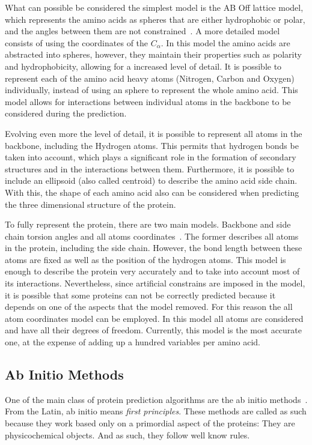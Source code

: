What can possible be considered the simplest model is the AB Off lattice model,
which represents the amino acids as spheres that are either hydrophobic or
polar, and the angles between them are not
constrained~\cite{berger1998protein}.  A more detailed model consists of using
the coordinates of the $C_\alpha$. In this model the amino acids are abstracted
into spheres, however, they maintain their properties such as polarity and
hydrophobicity, allowing for a increased level of detail. It is possible to
represent each of the amino acid heavy atoms (Nitrogen, Carbon and Oxygen)
individually, instead of using an sphere to represent the whole amino acid.
This model allows for interactions between individual atoms in the  backbone to
be considered during the prediction.

Evolving even more the level of detail, it is possible to represent all atoms
in the backbone, including the Hydrogen atoms. This permits that hydrogen bonds
be taken into account, which plays a significant role in the formation of
secondary structures and in the interactions between them. Furthermore, it is
possible to include an ellipsoid (also called centroid) to describe the amino
acid side chain. With this, the shape of each amino acid also can be considered
when predicting the three dimensional structure of the protein.

To fully represent the protein, there are two main models. Backbone and side
chain torsion angles and all atoms coordinates~\cite{rohl2004protein}.  The
former describes all atoms in the protein, including the side chain. However,
the bond length between these atoms are fixed as well as the position of the
hydrogen atoms. This model is enough to describe the protein very accurately
and to take into account most of its interactions. Nevertheless, since
artificial constrains are imposed in the model, it is possible that some
proteins can not be correctly predicted because it depends on one of the
aspects that the model removed. For this reason the all atom coordinates model
can be employed. In this model all atoms are considered and have all their
degrees of freedom. Currently, this model is the most accurate one, at the
expense of adding up a hundred variables per amino acid.

\subsection{Ab Initio Methods}\label{sec:ab-initio}

One of the main class of protein prediction algorithms are the ab initio
methods~\cite{lee2017ab}. From the Latin, ab initio means \textit{first
principles}. These methods are called as such because they work based only on a
primordial aspect of the proteins: They are physicochemical objects. And as
such, they follow well know rules.

